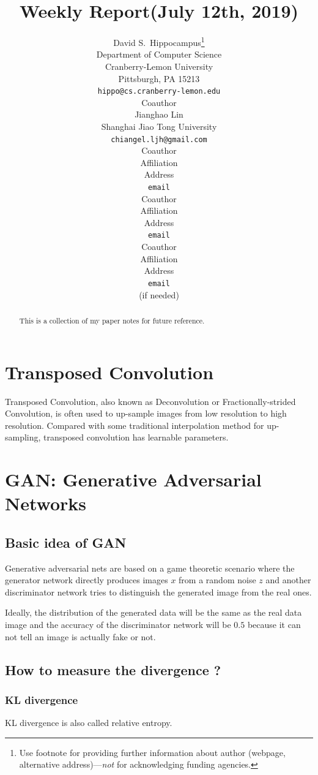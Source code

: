 \documentclass{article} %
\title{Weekly Report(July 12th, 2019)
}
\author{
David S.~Hippocampus\thanks{ Use footnote for providing further information
about author (webpage, alternative address)---\emph{not} for acknowledging
funding agencies.} \\
Department of Computer Science\\
Cranberry-Lemon University\\
Pittsburgh, PA 15213 \\
\texttt{hippo@cs.cranberry-lemon.edu} \\
\And
Coauthor \\
Jianghao Lin \\
Shanghai Jiao Tong University \\
\texttt{chiangel.ljh@gmail.com} \\
\AND
Coauthor \\
Affiliation \\
Address \\
\texttt{email} \\
\And
Coauthor \\
Affiliation \\
Address \\
\texttt{email} \\
\And
Coauthor \\
Affiliation \\
Address \\
\texttt{email} \\
(if needed)\\
}
\begin{document}
\maketitle

\begin{abstract}
This is a collection of my paper notes for future reference.
\end{abstract}

\newpage
\tableofcontents
\newpage

\section{Transposed Convolution}

Transposed Convolution, also known as Deconvolution or Fractionally-strided Convolution, is often used to up-sample images from low resolution to high resolution. Compared with some traditional interpolation method for up-sampling, transposed convolution has learnable parameters.

\newpage

\section{GAN: Generative Adversarial Networks}

\subsection{Basic idea of GAN}

Generative adversarial nets are based on a game theoretic scenario where the generator network directly produces images $x$ from a random noise $z$ and another discriminator network tries to distinguish the generated image from the real ones.

Ideally, the distribution of the generated data will be the same as the real data image and the accuracy of the discriminator network will be $0.5$ because it can not tell an image is actually fake or not.

\subsection{How to measure the divergence ?}

\subsubsection{KL divergence}

KL divergence is also called relative entropy. 
\end{document}
